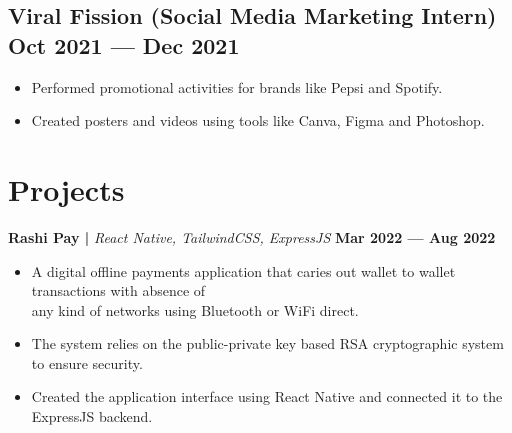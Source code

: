 \documentclass[a4,10pt]{article}
\newenvironment{zitemize}{
\begin{itemize}\itemsep0pt \parskip0pt \parsep1pt}
{\end{itemize}\vspace{-0.5cm}}
\begin{document}
\subsection*{Viral Fission {\normalsize\normalfont (Social Media Marketing Intern)} \hfill Oct 2021 --- Dec 2021}
    \begin{zitemize}
        \item Performed promotional activities for brands like Pepsi and Spotify.
        \item Created posters and videos using tools like Canva, Figma and Photoshop.
    \end{zitemize}
\vspace{-0.25cm}


    
\section{Projects}
\vspace{-0.1cm}
\textbf{Rashi Pay | } \emph{React Native, TailwindCSS, ExpressJS} \textbf{\hfill Mar 2022 --- Aug 2022}
\vspace{-0.2cm}
    \begin{zitemize}
        \item A digital offline payments application that caries out wallet to wallet transactions with absence of\\ any kind of networks using Bluetooth or WiFi direct.
        \item The system relies on the public-private key based RSA cryptographic system to ensure security.
        \item Created the application interface using React Native and connected it to the ExpressJS backend.
    \end{zitemize}
    
\end{document}
